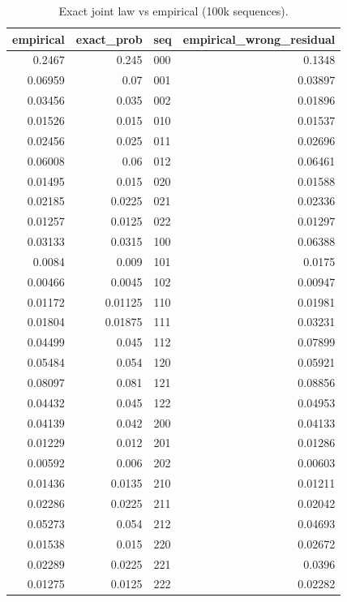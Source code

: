 \begin{table}
\caption{Exact joint law vs empirical (100k sequences).}
\label{tab:task3_markov_joint_table}
\begin{tabular}{rrlr}
\toprule
empirical & exact\_prob & seq & empirical\_wrong\_residual \\
\midrule
0.2467 & 0.245 & 000 & 0.1348 \\
0.06959 & 0.07 & 001 & 0.03897 \\
0.03456 & 0.035 & 002 & 0.01896 \\
0.01526 & 0.015 & 010 & 0.01537 \\
0.02456 & 0.025 & 011 & 0.02696 \\
0.06008 & 0.06 & 012 & 0.06461 \\
0.01495 & 0.015 & 020 & 0.01588 \\
0.02185 & 0.0225 & 021 & 0.02336 \\
0.01257 & 0.0125 & 022 & 0.01297 \\
0.03133 & 0.0315 & 100 & 0.06388 \\
0.0084 & 0.009 & 101 & 0.0175 \\
0.00466 & 0.0045 & 102 & 0.00947 \\
0.01172 & 0.01125 & 110 & 0.01981 \\
0.01804 & 0.01875 & 111 & 0.03231 \\
0.04499 & 0.045 & 112 & 0.07899 \\
0.05484 & 0.054 & 120 & 0.05921 \\
0.08097 & 0.081 & 121 & 0.08856 \\
0.04432 & 0.045 & 122 & 0.04953 \\
0.04139 & 0.042 & 200 & 0.04133 \\
0.01229 & 0.012 & 201 & 0.01286 \\
0.00592 & 0.006 & 202 & 0.00603 \\
0.01436 & 0.0135 & 210 & 0.01211 \\
0.02286 & 0.0225 & 211 & 0.02042 \\
0.05273 & 0.054 & 212 & 0.04693 \\
0.01538 & 0.015 & 220 & 0.02672 \\
0.02289 & 0.0225 & 221 & 0.0396 \\
0.01275 & 0.0125 & 222 & 0.02282 \\
\bottomrule
\end{tabular}
\end{table}
